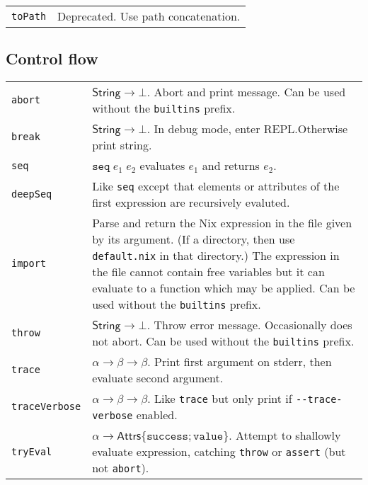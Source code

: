 \documentclass[9pt, a4paper, landscape]{extarticle}
\newcommand{\cmd}[1]{\texttt{#1}}
\newcommand{\str}{\textsf{String}}
\newcommand{\ats}{\textsf{Attrs}}
\begin{document}
\begin{multicols*}{3}
\begin{tabularx}{\columnwidth}{@{}l>{\raggedright\arraybackslash}X@{}}
  
  \cmd{toPath} & Deprecated. Use path concatenation. \\
\end{tabularx}


\subsection*{Control flow}

\begin{tabularx}{\columnwidth}{@{}l>{\raggedright\arraybackslash}X@{}}
  \cmd{abort} & $\str \to \bot $. Abort and print message. Can be
                used without the \cmd{builtins} prefix. \\

  \cmd{break} & $\str \to \bot $. In debug mode, enter REPL.\@ Otherwise
  print string.\\

  \cmd{seq}  & $\cmd{seq} \; e_1 \; e_2$ evaluates $e_1$ and returns $e_2$.  \\

  \cmd{deepSeq} & Like \cmd{seq} except that elements or attributes of
  the first expression are recursively evaluted. \\ 
  
  \cmd{import} & Parse and return the Nix expression in the file given
                 by its argument. (If a directory, then use
                 \cmd{default.nix} in that directory.) The expression
                 in the file cannot contain free variables but it can
                 evaluate to a function which may be applied. Can be
                 used without the \cmd{builtins} prefix. \\

  \cmd{throw} & $\str\to\bot$. Throw error message. Occasionally does not
                abort. Can be used without the \cmd{builtins} prefix. \\

  \cmd{trace} & $\alpha\to\beta\to\beta$. Print first argument on stderr, then evaluate
  second argument. \\

  \cmd{traceVerbose} &  $\alpha\to\beta\to\beta$. Like \cmd{trace} but only print if
  \cmd{{-}{-}trace-verbose} enabled. \\

  \cmd{tryEval} & $\alpha\to\ats\{\cmd{success}; \cmd{value}\}$. Attempt to
  shallowly evaluate expression, catching \cmd{throw} or \cmd{assert}
  (but not \cmd{abort}). 
\end{tabularx}


\end{multicols*}
\end{document}
